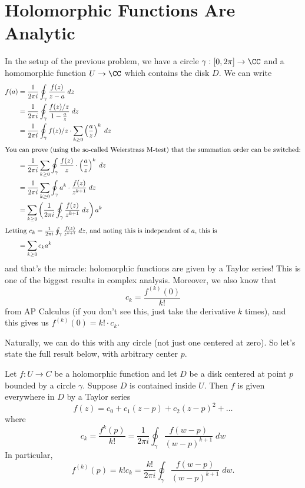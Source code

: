 \section{Holomorphic Functions Are Analytic}
In the setup of the previous problem, we have a circle $\gamma : [0,2\pi] \to \CC$
and a homomorphic function $U \to \CC$ which contains the disk $D$.
We can write
\begin{align*}
	f(a) &= \frac{1}{2\pi i} \oint_\gamma \frac{f(z)}{z-a} \; dz \\
	&= \frac{1}{2\pi i} \oint_\gamma \frac{f(z)/z}{1 - \frac az} \; dz \\
	&= \frac{1}{2\pi i} \oint_\gamma f(z)/z \cdot \sum_{k \ge 0} \left( \frac az \right)^k \; dz \\
	\intertext{You can prove (using the so-called Weierstrass M-test) that the summation order can be switched:}
	&= \frac{1}{2\pi i} \sum_{k \ge 0} \oint_\gamma \frac{f(z)}{z} \cdot \left( \frac az \right)^k \; dz \\
	&= \frac{1}{2\pi i} \sum_{k \ge 0} \oint_\gamma a^k \cdot \frac{f(z)}{z^{k+1}} \; dz \\
	&=  \sum_{k \ge 0} \left( \frac{1}{2\pi i}\oint_\gamma \frac{f(z)}{z^{k+1}} \; dz \right) a^k \\
	\intertext{Letting $c_k =  \frac{1}{2\pi i}\oint_\gamma \frac{f(z)}{z^{k+1}} \; dz$, and noting
this is independent of $a$, this is}
	&=  \sum_{k \ge 0} c_k a^k
\end{align*}
and that's the miracle: holomorphic functions are given by a Taylor series!
This is one of the biggest results in complex analysis.
Moreover, we also know that \[ c_k = \frac{f^{(k)}(0)}{k!} \] from AP Calculus (if you don't see this,
just take the derivative $k$ times), and this gives us $f^{(k)}(0) = k! \cdot c_k$.

Naturally, we can do this with any circle (not just one centered at zero).
So let's state the full result below, with arbitrary center $p$.

\begin{theorem}
	Let $f : U \to C$ be a holomorphic function and let $D$ be a disk centered at point $p$
	bounded by a circle $\gamma$.  Suppose $D$ is contained inside $U$.
	Then $f$ is given everywhere in $D$ by a Taylor series
	\[ 
		f(z) = c_0 + c_1(z-p) + c_2(z-p)^2 + \dots
	\]
	where
	\[
		c_k = \frac{f^{k}(p)}{k!} = \frac{1}{2\pi i} \oint_\gamma \frac{f(w-p)}{(w-p)^{k+1}} \; dw
	\]
	In particular, 
	\[ f^{(k)}(p) = k! c_k = \frac{k!}{2\pi i} \oint_\gamma \frac{f(w-p)}{(w-p)^{k+1}} \; dw. \]
\end{theorem}

